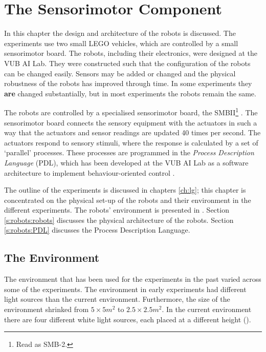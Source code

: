 \chapter{The Sensorimotor Component}\label{ch:robots}

In this chapter the design and architecture of the robots is discussed. The experiments use two small LEGO vehicles, which are controlled by a small sensorimotor board. The robots, including their electronics, were designed at the VUB AI Lab. They were constructed such that the configuration of the robots can be changed easily. Sensors may be added or changed and the physical robustness of the robots has improved through time. In some experiments they {\bf are} changed substantially, but in most experiments the robots remain the same.

The robots are controlled by a specialised sensorimotor board, the SMBII\footnote{Read as SMB-2.} \citep{vereertbrugghen:1996}. The sensorimotor board connects the sensory equipment with the actuators in such a way that the actuators and sensor readings are updated 40 times per second. The actuators respond to sensory stimuli, where the response is calculated by a set of `parallel' processes. These processes are programmed in the {\em Process Description Language} (PDL), which has been developed at the VUB AI Lab as a software architecture to implement behaviour-oriented control \citep{steels:1994b}. 

The outline of the experiments is discussed in chapters \ref{ch:lg}; this chapter is concentrated on the physical set-up of the robots and their environment in the different experiments. The robots' environment is presented in . Section \ref{s:robots:robots} discusses the physical architecture of the robots. Section \ref{s:robots:PDL} discusses the Process Description Language. 

\section{The Environment}\label{s:robots:envir}

The environment that has been used for the experiments in the past varied across some of the experiments. The environment in early experiments \citep{steelsvogt:1997,vogt:1998b,vogt:1998a} had different light sources than the current environment. Furthermore, the size of the environment shrinked from $5\times5 m^2$ to $2.5\times2.5 m^2$. In the current environment there are four different white light sources, each placed at a different height ().

